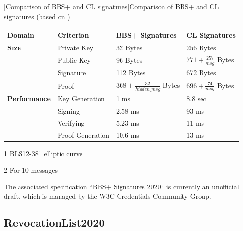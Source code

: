 		\begin{center}
            [Comparison of BBS+ and \acs{CL} signatures]{Comparison of BBS+ and \acs{CL} signatures (based on \citealp{mattr_intro_2020, helmy_solution_2020})}
        		\begin{threeparttable}
            		\begin{tabular}{llll}
            			\hline 
            			Domain & Criterion & BBS+ Signatures\tnote{1} & \ac{CL} Signatures\tabularnewline
            			\hline 
            			\textbf{Size} & Private Key & 32 Bytes  & 256 Bytes\tabularnewline
            			              & Public Key  & 96 Bytes  & \begin{math}771 + \frac{257}{msg}\end{math} Bytes\tabularnewline
            			              & Signature   & 112 Bytes & 672 Bytes\tabularnewline
            			              & Proof       & \begin{math}368 + \frac{32}{hidden\_msg}\end{math} Bytes & \begin{math}696 + \frac{74}{msg}\end{math} Bytes\tabularnewline
            			              
            			\textbf{Performance} & Key Generation            & 1 ms    & 8.8 sec\tabularnewline
            			                     & Signing\tnote{2}          & 2.58 ms & 93 ms\tabularnewline
            			                     & Verifying\tnote{2}        & 5.23 ms & 11 ms\tabularnewline
            			                     & Proof Generation\tnote{2} & 10.6 ms & 13 ms\tabularnewline
            			\hline 
            		\end{tabular}
        
        		\begin{tablenotes}\footnotesize 
        			\item[1] BLS12-381 elliptic curve
        			\item[2] For 10 messages
        		\end{tablenotes}
        	\end{threeparttable}
        	\label{tab: comparison bbs+ and cl}
    	\end{center} 
		
		The associated specification “BBS+ Signatures 2020” \cite{looker_bbs_2021} is currently an unofficial draft, which is managed by the W3C Credentials Community Group. \cite[pp. 18-20]{young_verifiable_2021}
		
		\subsection{RevocationList2020}\label{subsection: revocationlist2020}
		
